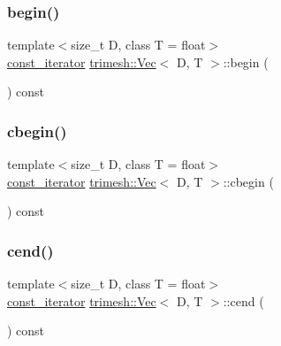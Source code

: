 \mbox{\label{classtrimesh_1_1Vec_ae39f4c593b1e151e32b269ca51ad1997}} 
\subsubsection{\texorpdfstring{begin()}{begin()}\hspace{0.1cm}{\footnotesize\ttfamily [2/2]}}
{\footnotesize\ttfamily template$<$size\+\_\+t D, class T = float$>$ \\
\hyperlink{classtrimesh_1_1Vec_a3bd4f0e8856d283ef56a63a106881bb9}{const\+\_\+iterator} \hyperlink{classtrimesh_1_1Vec}{trimesh\+::\+Vec}$<$ D, T $>$\+::begin (\begin{DoxyParamCaption}{ }\end{DoxyParamCaption}) const\hspace{0.3cm}{\ttfamily [inline]}}

\mbox{\label{classtrimesh_1_1Vec_a99d38e581eabd18b1166038e311bb6d1}} 
\subsubsection{\texorpdfstring{cbegin()}{cbegin()}}
{\footnotesize\ttfamily template$<$size\+\_\+t D, class T = float$>$ \\
\hyperlink{classtrimesh_1_1Vec_a3bd4f0e8856d283ef56a63a106881bb9}{const\+\_\+iterator} \hyperlink{classtrimesh_1_1Vec}{trimesh\+::\+Vec}$<$ D, T $>$\+::cbegin (\begin{DoxyParamCaption}{ }\end{DoxyParamCaption}) const\hspace{0.3cm}{\ttfamily [inline]}}

\mbox{\label{classtrimesh_1_1Vec_af16ea1f47293f808629a763f33bbbef6}} 
\subsubsection{\texorpdfstring{cend()}{cend()}}
{\footnotesize\ttfamily template$<$size\+\_\+t D, class T = float$>$ \\
\hyperlink{classtrimesh_1_1Vec_a3bd4f0e8856d283ef56a63a106881bb9}{const\+\_\+iterator} \hyperlink{classtrimesh_1_1Vec}{trimesh\+::\+Vec}$<$ D, T $>$\+::cend (\begin{DoxyParamCaption}{ }\end{DoxyParamCaption}) const\hspace{0.3cm}{\ttfamily [inline]}}

